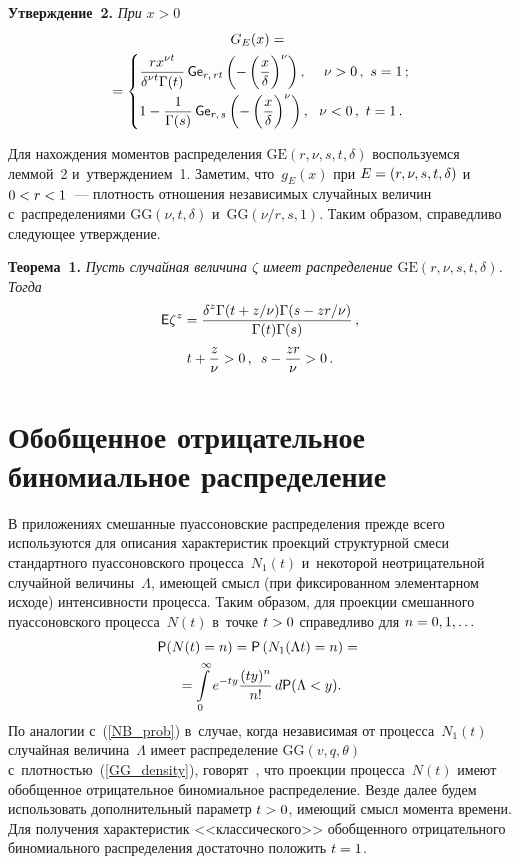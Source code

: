 \begin{multicols}{2}
\smallskip

\noindent
\textbf{Утверждение~2.}
\textit{При} $x>0$
\begin{multline*}
G_E(x) ={}\\
{}=
 \begin{cases}
    \displaystyle \fr{rx^{\nu t}}{\delta^{\nu t}\Gamma(t)}\,
{\sf Ge}_{r,\,rt}\left(-\left(\fr{x}{\delta}\right)^{\nu}\right), &\!\ \nu>0\,,\ 
s=1\,;\\[9pt]
   \displaystyle 1-\fr{1}{\Gamma(s)}\,{\sf Ge}_{r,\,s}\left(-
\left(\fr{x}{\delta}\right)^{\nu}\right), &\! \nu<0\,,\ t=1\,.
 \end{cases}
\end{multline*}

Для нахождения моментов распределения $\mathrm{GE}(r,\nu,s,t,\delta)$ воспользуемся 
леммой~2 и~утверждением~1. Заметим, что~$g_E(x)$ 
при $E\hm=(r,\nu,s,t,\delta)$ и~$0\hm<r\hm<1$~--- плотность отношения независимых  
случайных величин с~распределениями $\mathrm{GG}(\nu,t,\delta)$ и~$\mathrm{GG}(\nu/r,s,1)$. Таким 
образом, справедливо следующее утверждение.

\smallskip

\noindent
\textbf{Теорема~1.}
\textit{Пусть случайная величина $\zeta$ имеет распределение $\mathrm{GE}(r,\nu,s,t,\delta)$. 
Тогда}
\begin{multline*}
{\sf E}\zeta^z=\displaystyle\frac{\displaystyle \delta^{z} \Gamma(t+z/\nu)\Gamma(s-
zr/\nu)\mathstrut}{\displaystyle \Gamma(t)\Gamma(s)\mathstrut}\,, \\  
 t+\displaystyle\frac{\displaystyle z\mathstrut}{\displaystyle \nu\mathstrut}>0\,, \enskip  s-\displaystyle\frac{\displaystyle zr\mathstrut}{\displaystyle \nu\mathstrut}>0\,.
\end{multline*}

\section{Обобщенное отрицательное биномиальное распределение}


В приложениях смешанные пуассоновские распределения прежде всего используются 
для описания характеристик проекций структурной смеси стандартного 
пуассоновского процесса~$N_1(t)$ и~некоторой неотрицательной случайной величины~$\Lambda$, 
имеющей смысл (при фиксированном элементарном исходе) интенсивности 
процесса. Таким образом, для проекции смешанного пуассоновского процесса~$N(t)$ в~точке $t\hm>0$ справедливо для $n\hm=0,1,\ldots$
\begin{multline}
\label{MPP_distrib}
{\sf P}(N(t)=n)={\sf P}\left(N_1(\Lambda t)=n\right)={}\\
{}=
\int\limits_0^\infty e^{-ty}\displaystyle\frac{\displaystyle (ty)^n\mathstrut}{\displaystyle n!\mathstrut}\, 
d{\sf P}(\Lambda<y).
\end{multline}
По аналогии с~(\ref{NB_prob}) в~случае, когда независимая от процесса~$N_1(t)$ 
случайная величина~$\Lambda$ имеет распределение $\mathrm{GG}(v,q,\theta)$ 
с~плотностью~(\ref{GG_density}), говорят~\cite{KoZe2018}, что проекции процесса~$N(t)$ 
имеют 
обобщенное отрицательное биномиальное распределение. Везде далее будем 
использовать дополнительный параметр $t\hm>0$, имеющий смысл момента времени. Для 
получения характеристик <<классического>> обобщенного отрицательного 
биномиального распределения достаточно положить $t\hm=1$.


\end{multicols}
